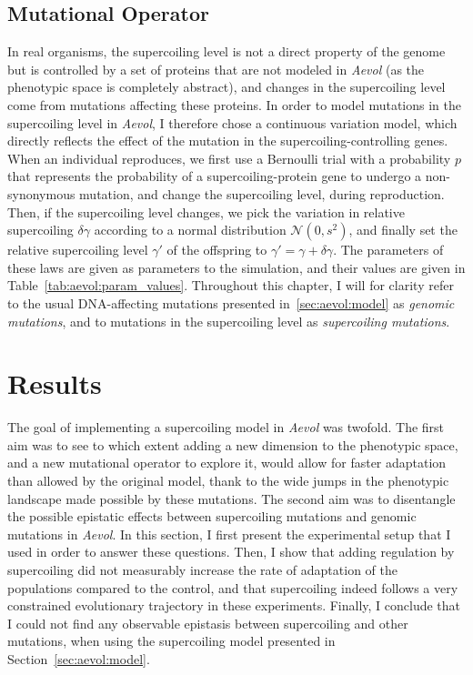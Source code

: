 \subsection{Mutational Operator}
In real organisms, the supercoiling level is not a direct property of the genome but is controlled by a set of proteins that are not modeled in \emph{Aevol} (as the phenotypic space is completely abstract), and changes in the supercoiling level come from mutations affecting these proteins.
In order to model mutations in the supercoiling level in \emph{Aevol}, I therefore chose a continuous variation model, which directly reflects the effect of the mutation in the supercoiling-controlling genes.
When an individual reproduces, we first use a Bernoulli trial with a probability $p$ that represents the probability of a supercoiling-protein gene to undergo a non-synonymous mutation, and change the supercoiling level, during reproduction.
Then, if the supercoiling level changes, we pick the variation in relative supercoiling $\delta\gamma$ according to a normal distribution $\mathcal{N}(0, s^2)$, and finally set the relative supercoiling level $\gamma'$ of the offspring to $\gamma' = \gamma + \delta\gamma$.
The parameters of these laws are given as parameters to the simulation, and their values are given in Table~\ref{tab:aevol:param_values}.
Throughout this chapter, I will for clarity refer to the usual DNA-affecting mutations presented in~\ref{sec:aevol:model} as \emph{genomic mutations}, and to mutations in the supercoiling level as \emph{supercoiling mutations}.


\section{Results}
\label{sec:aevol:results}

The goal of implementing a supercoiling model in \emph{Aevol} was twofold.
The first aim was to see to which extent adding a new dimension to the phenotypic space, and a new mutational operator to explore it, would allow for faster adaptation than allowed by the original model, thank to the wide jumps in the phenotypic landscape made possible by these mutations.
The second aim was to disentangle the possible epistatic effects between supercoiling mutations and genomic mutations in \emph{Aevol}.
In this section, I first present the experimental setup that I used in order to answer these questions.
Then, I show that adding regulation by supercoiling did not measurably increase the rate of adaptation of the populations compared to the control, and that supercoiling indeed follows a very constrained evolutionary trajectory in these experiments.
Finally, I conclude that I could not find any observable epistasis between supercoiling and other mutations, when using the supercoiling model presented in Section~\ref{sec:aevol:model}.


